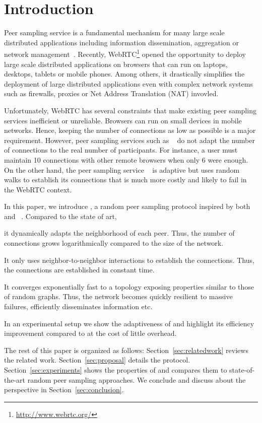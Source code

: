 
\section{Introduction}

Peer sampling service is a fundamental mechanism for many large scale
distributed applications including information dissemination, aggregation or
network management~\cite{jelasity2007gossip}. Recently,
WebRTC\footnote{\url{http://www.webrtc.org/}} opened the opportunity to deploy
large scale distributed applications on browsers that can run on laptops,
desktops, tablets or mobile phones. Among others, it drastically simplifies the
deployment of large distributed applications even with complex network systems
such as firewalls, proxies or Net Address Translation (NAT) invovled.

Unfortunately, WebRTC has several constraints that make existing peer
sampling services inefficient or unreliable. Browsers can run
on small devices in mobile networks. Hence, keeping the number of
connections as low as possible is a major requirement. However, peer
sampling services such as \CYCLON~\cite{voulgaris2005cyclon} do not
adapt the number of connections to the real number of
participants. For instance, a user must maintain 10 connections with
other remote browsers when only 6 were enough. On the other hand, the
peer sampling service \SCAMP~\cite{ganesh2003peer} is adaptive but
uses random walks to establish its connections that is much more
costly and likely to fail in the WebRTC context.

In this paper, we introduce \SPRAY, a random peer sampling protocol inspired
by both \CYCLON~\cite{voulgaris2005cyclon} and
\SCAMP~\cite{ganesh2003peer}. Compared to the state of art,
\begin{inparaenum}[(i)]
\item it dynamically adapts the neighborhood of each peer. Thus, the number of
  connections grows logarithmically compared to the size of the network.
\item It only uses neighbor-to-neighbor interactions to establish the
  connections. Thus, the connections are established in constant time.
\item It converges exponentially fast to a topology exposing properties similar
  to those of random graphs. Thus, the network becomes quickly resilient to
  massive failures, efficiently disseminates information etc.
\item In an experimental setup we show the adaptiveness of \SPRAY and
  highlight its efficiency improvement compared to \CYCLON at the cost of
  little overhead.
\end{inparaenum}

The rest of this paper is organized as follows: Section~\ref{sec:relatedwork}
reviews the related work. Section~\ref{sec:proposal} details the \SPRAY
protocol. Section~\ref{sec:experiments} shows the properties of \SPRAY
and compares them to state-of-the-art random peer sampling approaches. We
conclude and discuss about the perspective in Section~\ref{sec:conclusion}.


